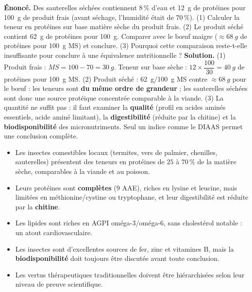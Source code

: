 \documentclass[11pt]{article}
\begin{document}
\begin{exoresolu}
\textbf{Énoncé.} Des sauterelles séchées contiennent $8\,\%$ d'eau et \SI{12}{g} de protéines pour \SI{100}{g} de produit frais (avant séchage, l'humidité était de $70\,\%$). (1) Calculer la teneur en protéines sur base matière sèche du produit frais. (2) Le produit séché contient \SI{62}{g} de protéines pour \SI{100}{g}. Comparer avec le bœuf maigre ($\approx \SI{68}{g}$ de protéines pour \SI{100}{g} MS) et conclure. (3) Pourquoi cette comparaison reste-t-elle insuffisante pour conclure à une équivalence nutritionnelle ?
\tcblower
\textbf{Solution.} (1) Produit frais : $MS = 100 - 70 = \SI{30}{g}$. Teneur sur base sèche : $12 \times \dfrac{100}{30} = \SI{40}{g}$ de protéines pour \SI{100}{g} MS.
(2) Produit séché : \SI{62}{g}/\SI{100}{g} MS contre $\approx \SI{68}{g}$ pour le bœuf : les teneurs sont \textbf{du même ordre de grandeur} ; les sauterelles séchées sont donc une source protéique concentrée comparable à la viande.
(3) La quantité ne suffit pas : il faut examiner la \textbf{qualité} (profil en acides aminés essentiels, acide aminé limitant), la \textbf{digestibilité} (réduite par la chitine) et la \textbf{biodisponibilité} des micronutriments. Seul un indice comme le DIAAS permet une conclusion complète.
\end{exoresolu}

\begin{aretenir}
\begin{itemize}
\item Les insectes comestibles locaux (termites, vers de palmier, chenilles, sauterelles) présentent des teneurs en protéines de $25$ à $70\,\%$ de la matière sèche, comparables à la viande et au poisson.
\item Leurs protéines sont \textbf{complètes} (9 AAE), riches en lysine et leucine, mais limitées en méthionine/cystine ou tryptophane, et leur digestibilité est réduite par la \textbf{chitine}.
\item Les lipides sont riches en AGPI oméga-3/oméga-6, sans cholestérol notable : un atout cardiovasculaire.
\item Les insectes sont d'excellentes sources de fer, zinc et vitamines B, mais la \textbf{biodisponibilité} doit toujours être discutée avant toute conclusion.
\item Les vertus thérapeutiques traditionnelles doivent être hiérarchisées selon leur niveau de preuve scientifique.
\end{itemize}
\end{aretenir}
\end{document}
